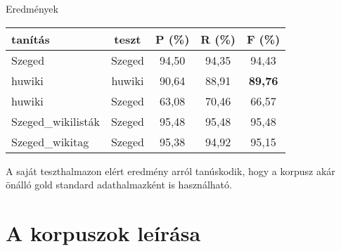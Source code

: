 \documentclass[utf8x,t]{beamer}
\newcommand{\vitem}{\item \vspace{4pt}}
\begin{document}
\begin{frame}{Eredmények}

\begin{center}
\begin{tabular}{lcccc}
\toprule 
\bf tanítás & \bf teszt & \bf P (\%) & \bf R (\%) & \bf F (\%) \\ 
\midrule
Szeged & Szeged & 94,50 & 94,35 & 94,43 \\
huwiki & huwiki & 90,64 & 88,91 &  \textbf{89,76}  \\
huwiki & Szeged & 63,08 & 70,46 & 66,57  \\
Szeged\_wikilisták & Szeged & 95,48 & 95,48 & 95,48  \\
Szeged\_wikitag & Szeged & 95,38 & 94,92 & 95,15 \\
\bottomrule
\end{tabular}
\end{center}

\bigskip

A saját teszthalmazon elért eredmény arról tanúskodik, hogy a korpusz akár önálló gold standard adathalmazként is használható.

\end{frame}




\section{A korpuszok leírása}
\end{document}
